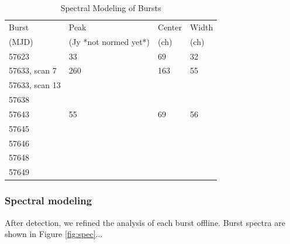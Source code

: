 \documentclass{emulateapj}
\begin{document}
\begin{table}
\caption{Spectral Modeling of Bursts}
\centering
\begin{tabular}{llll}
\hline
Burst & Peak & Center & Width \\
(MJD) & (Jy *not normed yet*) & (ch) & (ch) \\ \hline
57623 & 33 & 69 & 32 \\
57633, scan 7 & 260 & 163 & 55 \\
57633, scan 13 & & & \\
57638 & & & \\
57643 & 55 & 69 & 56 \\
57645 & & & \\
57646 & & & \\
57648 & & & \\
57649 & & & \\ \hline
\end{tabular}
\label{tab:spec}
\end{table} 

\subsubsection{Spectral modeling}
After detection, we refined the analysis of each burst offline. Burst spectra are shown in Figure \ref{fig:spec}...
\end{document}
